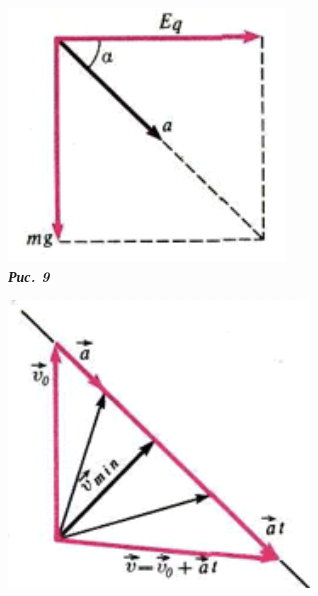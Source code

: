 \documentclass[a4paper,14pt]{article}
\begin{document}
    
    \begin{figure}[H]
        
        \begin{subfigure}[b]{0.3\textwidth}
            \centering
            \includegraphics[width=\textwidth]{pic9.png}
            \captionsetup{labelformat=empty,justification=raggedright,singlelinecheck=false}
            \caption{\textbf{\textit{Рис. 9}}}
        \end{subfigure}
        \hfill
        \begin{subfigure}[b]{0.3\textwidth}
            \centering
            \includegraphics[width=\textwidth]{pic10.png}

\end{subfigure}
\end{figure}
\end{document}
